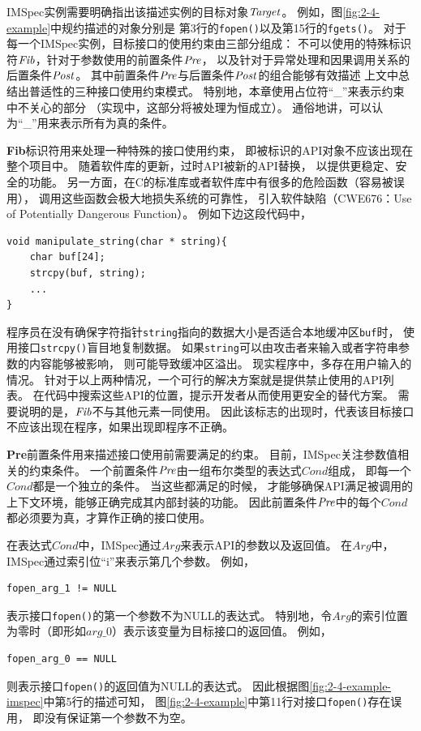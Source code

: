 
IMSpec实例需要明确指出该描述实例的目标对象$\mathit{Target}$。
例如，图\ref{fig:2-4-example}中规约描述的对象分别是
第3行的\texttt{fopen()}以及第15行的\texttt{fgets()}。
对于每一个IMSpec实例，目标接口的使用约束由三部分组成：
不可以使用的特殊标识符$\mathit{Fib}$，针对于参数使用的前置条件$\mathit{Pre}$，
以及针对于异常处理和因果调用关系的后置条件$\mathit{Post}$。
其中前置条件$\mathit{Pre}$与后置条件$\mathit{Post}$的组合能够有效描述
上文中总结出普适性的三种接口使用约束模式。
特别地，本章使用占位符“\_”来表示约束中不关心的部分
（实现中，这部分将被处理为恒成立）。
通俗地讲，可以认为“\_”用来表示所有为真的条件。

\textbf{Fib}标识符用来处理一种特殊的接口使用约束，
即被标识的API对象不应该出现在整个项目中。
随着软件库的更新，过时API被新的API替换，
以提供更稳定、安全的功能。
另一方面，在C的标准库或者软件库中有很多的危险函数（容易被误用），
调用这些函数会极大地损失系统的可靠性，
引入软件缺陷（CWE676：Use of Potentially Dangerous Function）。
例如下边这段代码中，
\begin{lstlisting}[language={[ANSI]C},
basicstyle=\linespread{0.8}\listingsfont,
numbers=none,
xleftmargin=.3\textwidth]
void manipulate_string(char * string){
	char buf[24];
	strcpy(buf, string);
	...
}
\end{lstlisting}
程序员在没有确保字符指针\texttt{string}指向的数据大小是否适合本地缓冲区\texttt{buf}时，
使用接口\texttt{strcpy()}盲目地复制数据。
如果\texttt{string}可以由攻击者来输入或者字符串参数的内容能够被影响，
则可能导致缓冲区溢出。
现实程序中，多存在用户输入的情况。
针对于以上两种情况，一个可行的解决方案就是提供禁止使用的API列表。
在代码中搜索这些API的位置，提示开发者从而使用更安全的替代方案。
需要说明的是，$\mathit{Fib}$不与其他元素一同使用。
因此该标志的出现时，代表该目标接口不应该出现在程序，如果出现即程序不正确。


\textbf{Pre}前置条件用来描述接口使用前需要满足的约束。
目前，IMSpec关注参数值相关的约束条件。
一个前置条件$\mathit{Pre}$由一组布尔类型的表达式$\mathit{Cond}$组成，
即每一个$\mathit{Cond}$都是一个独立的条件。
当这些都满足的时候，
才能够确保API满足被调用的上下文环境，能够正确完成其内部封装的功能。
因此前置条件$\mathit{Pre}$中的每个$\mathit{Cond}$都必须要为真，才算作正确的接口使用。

在表达式$\mathit{Cond}$中，IMSpec通过$\mathit{Arg}$来表示API的参数以及返回值。
在$\mathit{Arg}$中，IMSpec通过索引位“i”来表示第几个参数。
例如，
\begin{lstlisting}[language={[ANSI]C},
basicstyle=\linespread{0.8}\listingsfont,
numbers=none,
xleftmargin=.3\textwidth]
fopen_arg_1 != NULL
\end{lstlisting}
表示接口\texttt{fopen()}的第一个参数不为NULL的表达式。
特别地，令$\mathit{Arg}$的索引位置为零时（即形如$arg\_0$）表示该变量为目标接口的返回值。
例如，
\begin{lstlisting}[language={[ANSI]C},
basicstyle=\linespread{0.8}\listingsfont,
numbers=none,
xleftmargin=.3\textwidth,]
fopen_arg_0 == NULL
\end{lstlisting}
则表示接口\texttt{fopen()}的返回值为NULL的表达式。
因此根据图\ref{fig:2-4-example-imspec}中第5行的描述可知，
图\ref{fig:2-4-example}中第11行对接口\texttt{fopen()}存在误用，
即没有保证第一个参数不为空。


